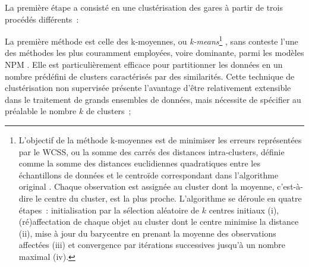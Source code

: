 \begin{refsegment}
La première étape a consisté en une clustérisation des gares à partir de trois procédés différents~:
\begin{customitemize}
    \item La première méthode est celle des k-moyennes, ou \textsl{k-means}\footnote{
        L’objectif de la méthode k-moyennes est de minimiser les erreurs représentées par le \acrfull{WCSS}, ou la somme des carrés des distances intra-clusters, définie comme la somme des distances euclidiennes quadratiques entre les échantillons de données et le centroïde correspondant dans l’algorithme original \textcolor{blue}{\autocite[4]{barve_reef-insight_2023}}. Chaque observation est assignée au cluster dont la moyenne, c'est-à-dire le centre du cluster, est la plus proche. L'algorithme se déroule en quatre étapes~: initialisation par la sélection aléatoire de \(k\) centres initiaux (i), (ré)affectation de chaque objet au cluster dont le centre minimise la distance (ii), mise à jour du barycentre en prenant la moyenne des observations affectées (iii) et convergence par itérations successives jusqu’à un nombre maximal (iv).
    } \textcolor{blue}{\autocite[281]{macqueen_methods_1967}}, sans conteste l’une des méthodes les plus couramment employées, voire dominante, parmi les modèles \acrshort{NPM} \textcolor{blue}{\autocites[132]{caset_planning_2019}[12]{cao_coordination_2020}[248]{yang_tod_2021}[5]{liao_evaluating_2022}[3]{amini_pishro_integrated_2023}[628]{wei_classifying_2023}[2]{zhou_introducing_2023}}. Elle est particulièrement efficace pour partitionner les données en un nombre prédéfini de clusters caractérisés par des similarités. Cette technique de clustérisation non supervisée présente l’avantage d’être relativement extensible dans le traitement de grands ensembles de données, mais nécessite de spécifier au préalable le nombre \(k\) de clusters~;

\end{customitemize}
\end{refsegment}
